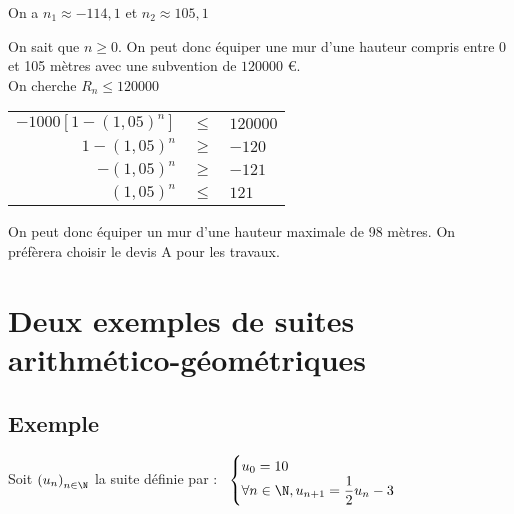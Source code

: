 \begin{itemize}
\vspace*{.3cm}

On a $n_1 \approx -114,1$ et $n_2 \approx 105,1$ \\


\vspace*{.3cm}

On sait que $n \geqslant 0$. On peut donc équiper une mur d'une hauteur compris entre 0 et 105 mètres avec une subvention de $120 000$ €. \\

On cherche $R_n \leqslant 120 000$ \\

\begin{tabular}{rll}
$ -1000\left[1-\left(1,05\right)^n\right]$ & $\leq$ &  $120 000$ \\
$1-\left(1,05\right)^n$ & $\geq$ & $-120$ \\
$-\left(1,05\right)^n$ & $\geq$ & $-121$ \\
$\left(1,05\right)^n$ & $\leq$ & $121$ \\
\end{tabular}

\vspace*{.3cm}

On peut donc équiper un mur d'une hauteur maximale de 98 mètres. On préfèrera choisir le devis A pour les travaux.

\end{itemize}

\newpage

\vspace*{-1.7cm}

\section{Deux exemples de suites arithmético-géométriques}

\subsection{Exemple }

Soit $\left(u_n\right)_{n \in \N}$ la suite définie par :$ \; \; \; \begin{cases}
u_0 = 10 \\
\forall n \in \N, u_{n+1} = \dfrac{1}{2} u_n - 3 \\
\end{cases}$ \\

